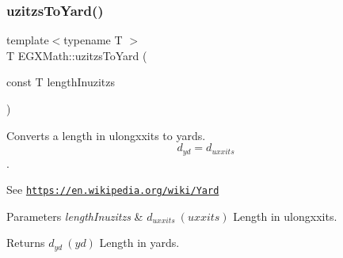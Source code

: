 \subsubsection{\texorpdfstring{uzitzs\+To\+Yard()}{uzitzsToYard()}}
{\footnotesize\ttfamily template$<$typename T $>$ \\
T E\+G\+X\+Math\+::uzitzs\+To\+Yard (\begin{DoxyParamCaption}\item[{const T}]{length\+Inuzitzs }\end{DoxyParamCaption})}



Converts a length in ulongxxits to yards. \[ d_{yd}=d_{uxxits} \]. 

See \href{https://en.wikipedia.org/wiki/Yard}{\tt https\+://en.\+wikipedia.\+org/wiki/\+Yard} 
\begin{DoxyParams}{Parameters}
{\em length\+Inuzitzs} & $ d_{uxxits}\ (uxxits)$ Length in ulongxxits. \\
\hline
\end{DoxyParams}
\begin{DoxyReturn}{Returns}
$ d_{yd}\ (yd)$ Length in yards. 
\end{DoxyReturn}
